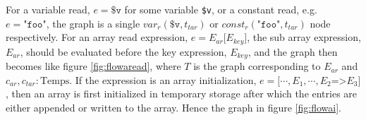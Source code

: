 \begin{figure}
{\begin{adjustbox}{max size={.24\textwidth}{.25\textheight}}
\end{adjustbox}}%
\hspace*{\fill}
\end{figure}

For a variable read, $e = \texttt{\$v}$ for some variable \texttt{\$v}, or a constant read, e.g. $e = \texttt{"foo"}$, the graph is a single $var_r(\texttt{\$v}, t_{tar})$ or $const_r(\texttt{"foo"}, t_{tar})$ node respectively. For an array read expression, $e = E_{ar}\texttt[E_{key}\texttt{]}$, the sub array expression, $E_{ar}$, should be evaluated before the key expression, $E_{key}$, and the graph then becomes like figure \ref{fig:flowaread}, where $T$ is the graph corresponding to $E_{ar}$ and $c_{ar}, c_{tar} : \text{Temps}$. If the expression is an array initialization, $e = \texttt{[}\cdots, E_1, \cdots, E_2\texttt{=>}E_3\texttt{]}$, then an array is first initialized in temporary storage after which the entries are either appended or written to the array. Hence the graph in figure \ref{fig:flowai}.
